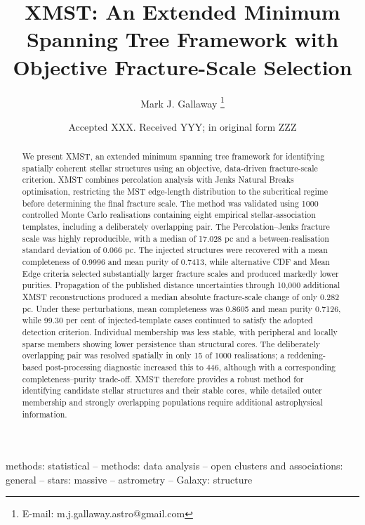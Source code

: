 \documentclass[fleqn,usenatbib]{mnras}
\title[XMST: Objective Fracture-Scale Selection]{XMST: An Extended Minimum Spanning Tree Framework with Objective Fracture-Scale Selection}
\author[Mark J. Gallaway]{
Mark J. Gallaway \thanks{E-mail: m.j.gallaway.astro@gmail.com}
\\
}
\date{Accepted XXX. Received YYY; in original form ZZZ}
\begin{document}
\label{firstpage}
\pagerange{\pageref{firstpage}--\pageref{lastpage}}
\maketitle

\begin{abstract}
We present XMST, an extended minimum spanning tree framework for identifying spatially coherent stellar structures using an objective, data-driven fracture-scale criterion. XMST combines percolation analysis with Jenks Natural Breaks optimisation, restricting the MST edge-length distribution to the subcritical regime before determining the final fracture scale. The method was validated using 1000 controlled Monte Carlo realisations containing eight empirical stellar-association templates, including a deliberately overlapping pair. The Percolation–Jenks fracture scale was highly reproducible, with a median of 17.028 pc and a between-realisation standard deviation of 0.066 pc. The injected structures were recovered with a mean completeness of 0.9996 and mean purity of 0.7413, while alternative CDF and Mean Edge criteria selected substantially larger fracture scales and produced markedly lower purities.
Propagation of the published distance uncertainties through 10,000 additional XMST reconstructions produced a median absolute fracture-scale change of only 0.282 pc. Under these perturbations, mean completeness was 0.8605 and mean purity 0.7126, while 99.30 per cent of injected-template cases continued to satisfy the adopted detection criterion. Individual membership was less stable, with peripheral and locally sparse members showing lower persistence than structural cores. The deliberately overlapping pair was resolved spatially in only 15 of 1000 realisations; a reddening-based post-processing diagnostic increased this to 446, although with a corresponding completeness–purity trade-off. XMST therefore provides a robust method for identifying candidate stellar structures and their stable cores, while detailed outer membership and strongly overlapping populations require additional astrophysical information.

\end{abstract}

\begin{keywords}
methods: statistical -- methods: data analysis -- open clusters and associations: general -- stars: massive -- astrometry -- Galaxy: structure
\end{keywords}
\end{document}
